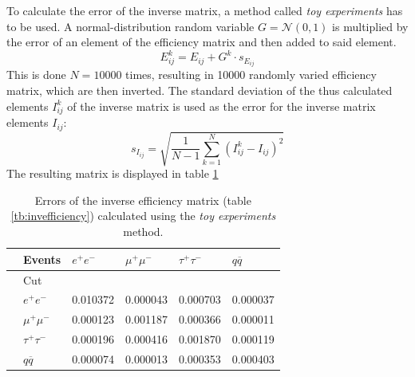 To calculate the error of the inverse matrix, a method called \emph{toy experiments} has to be used. A normal-distribution random variable $G=\mathcal{N}(0,1)$ is multiplied by the error of an element of the efficiency matrix and then added to said element.
\begin{equation}
E^{k}_{ij}=E_{ij}+G^k\cdot s_{E_{ij}}
\end{equation}
This is done $N=10000$ times, resulting in 10000 randomly varied efficiency matrix, which are then inverted. The standard deviation of the thus calculated elements $I^k_{ij}$ of the inverse matrix is used as the error for the inverse matrix elements $I_{ij}$: 
\begin{equation}
s_{I_{ij}}=\sqrt{\frac{1}{N-1}\sum_{k=1}^{N}\left(I^k_{ij}-I_{ij}\right)^2}
\end{equation}
The resulting matrix is displayed in table \ref{tb:invefficiencyerror}
\begin{table}[H]\centering
	\begin{tabular}{@{}llllll@{}}
		\toprule
		&Events &$e^+e^-$&$\mu^+\mu^-$&$\tau^+\tau^-$&$q\overline{q}$\\
		\midrule
		&Cut&&&&\\
		&$e^+e^-$&0.010372&0.000043&0.000703&0.000037\\
		&$\mu^+\mu^-$&0.000123&0.001187&0.000366&0.000011\\
		&$\tau^+\tau^-$&0.000196&0.000416&0.001870&0.000119\\
		&$q\overline{q}$&0.000074&0.000013&0.000353&0.000403\\
		\bottomrule
	\end{tabular}
	\caption[Inverse efficiency error matrix]{Errors of the inverse efficiency matrix (table \ref{tb:invefficiency}) calculated using the \emph{toy experiments} method.}
	\label{tb:invefficiencyerror}
\end{table}

